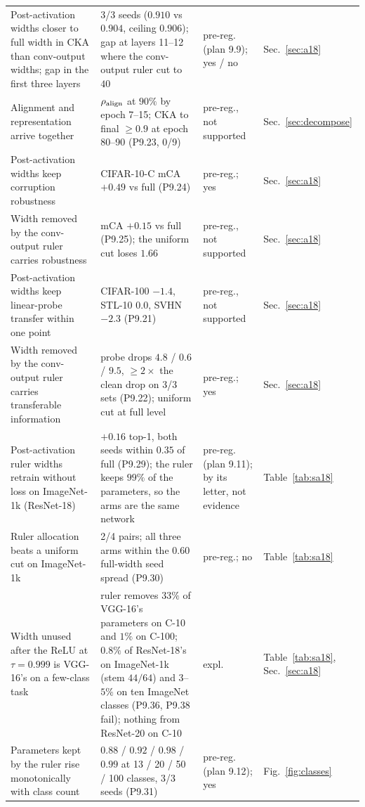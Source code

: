 \documentclass[10pt,journal,compsoc]{IEEEtran}
\begin{document}
\begin{table}[t]
\begin{tabular}{p{4.3cm}p{5.9cm}lp{2.5cm}}
  Post-activation widths closer to full width in CKA than conv-output widths; gap in the first three layers & 3/3 seeds ($0.910$ vs $0.904$, ceiling $0.906$); gap at layers 11--12 where the conv-output ruler cut to $40$ & pre-reg. (plan 9.9); yes / no & Sec.~\ref{sec:a18} \\
  Alignment and representation arrive together & $\rho_{\rm align}$ at $90\%$ by epoch 7--15; CKA to final $\ge 0.9$ at epoch 80--90 (P9.23, 0/9) & pre-reg., not supported & Sec.~\ref{sec:decompose} \\
  Post-activation widths keep corruption robustness & CIFAR-10-C mCA $+0.49$ vs full (P9.24) & pre-reg.; yes & Sec.~\ref{sec:a18} \\
  Width removed by the conv-output ruler carries robustness & mCA $+0.15$ vs full (P9.25); the uniform cut loses $1.66$ & pre-reg., not supported & Sec.~\ref{sec:a18} \\
  Post-activation widths keep linear-probe transfer within one point & CIFAR-100 $-1.4$, STL-10 $0.0$, SVHN $-2.3$ (P9.21) & pre-reg., not supported & Sec.~\ref{sec:a18} \\
  Width removed by the conv-output ruler carries transferable information & probe drops $4.8$ / $0.6$ / $9.5$, $\ge 2\times$ the clean drop on 3/3 sets (P9.22); uniform cut at full level & pre-reg.; yes & Sec.~\ref{sec:a18} \\
  Post-activation ruler widths retrain without loss on ImageNet-1k (ResNet-18) & $+0.16$ top-1, both seeds within $0.35$ of full (P9.29); the ruler keeps $99\%$ of the parameters, so the arms are the same network & pre-reg. (plan 9.11); by its letter, not evidence & Table~\ref{tab:sa18} \\
  Ruler allocation beats a uniform cut on ImageNet-1k & 2/4 pairs; all three arms within the $0.60$ full-width seed spread (P9.30) & pre-reg.; no & Table~\ref{tab:sa18} \\
  Width unused after the ReLU at $\tau = 0.999$ is VGG-16's on a few-class task & ruler removes $33\%$ of VGG-16's parameters on C-10 and $1\%$ on C-100; $0.8\%$ of ResNet-18's on ImageNet-1k (stem $44/64$) and $3$--$5\%$ on ten ImageNet classes (P9.36, P9.38 fail); nothing from ResNet-20 on C-10 & expl. & Table~\ref{tab:sa18}, Sec.~\ref{sec:a18} \\
  Parameters kept by the ruler rise monotonically with class count & $0.88$ / $0.92$ / $0.98$ / $0.99$ at 13 / 20 / 50 / 100 classes, 3/3 seeds (P9.31) & pre-reg. (plan 9.12); yes & Fig.~\ref{fig:classes} \\

\end{tabular}
\end{table}
\end{document}
